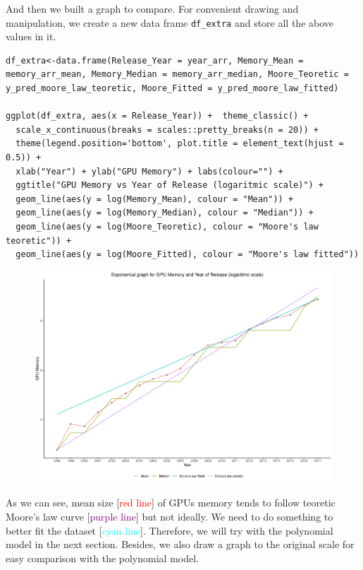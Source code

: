 \documentclass[a4paper]{article}
\begin{document}
And then we built a graph to compare. For convenient drawing and manipulation, we create a new data frame \verb|df_extra| and store all the above values in it.
\begin{mdframed}[leftline=false,rightline=false,backgroundcolor=lightblue!10,nobreak=false]
    \begin{verbatim}
df_extra<-data.frame(Release_Year = year_arr, Memory_Mean = memory_arr_mean, Memory_Median = memory_arr_median, Moore_Teoretic = y_pred_moore_law_teoretic, Moore_Fitted = y_pred_moore_law_fitted)

ggplot(df_extra, aes(x = Release_Year)) +  theme_classic() + 
  scale_x_continuous(breaks = scales::pretty_breaks(n = 20)) +
  theme(legend.position='bottom', plot.title = element_text(hjust = 0.5)) +
  xlab("Year") + ylab("GPU Memory") + labs(colour="") + 
  ggtitle("GPU Memory vs Year of Release (logaritmic scale)") + 
  geom_line(aes(y = log(Memory_Mean), colour = "Mean")) + 
  geom_line(aes(y = log(Memory_Median), colour = "Median")) +
  geom_line(aes(y = log(Moore_Teoretic), colour = "Moore's law teoretic")) +
  geom_line(aes(y = log(Moore_Fitted), colour = "Moore's law fitted")) 
    \end{verbatim}
\end{mdframed}
\begin{figure}[H]
    \centering
    \includegraphics[keepaspectratio, width=1\textwidth, height=1\textheight]{EM/compared_graph.pdf}
\end{figure}
As we can see, mean size [\textcolor{red}{red line}] of GPUs memory tends to follow teoretic Moore's law curve [\textcolor{purple}{purple line}] but not ideally. We need to do something to better fit the dataset [\textcolor{cyan}{cyan line}]. Therefore, we will try with the polynomial model in the next section. Besides, we also draw a graph to the original scale for easy comparison with the polynomial model.
\end{document}
